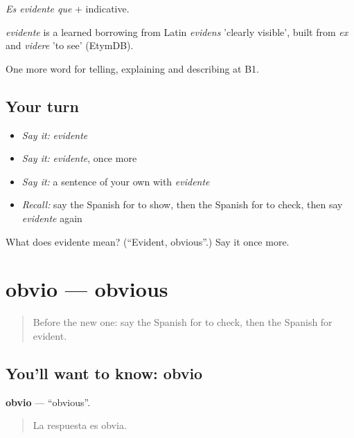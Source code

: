 \emph{Es evidente que} + indicative.

\begin{cousinweb}
\emph{evidente} is a learned borrowing from Latin \emph{evidens} 'clearly visible', built from \emph{ex} and \emph{videre} 'to see' (EtymDB).
\end{cousinweb}

\begin{grammarlens}[title={What you've built}]
One more word for telling, explaining and describing at B1.
\end{grammarlens}

\subsection*{Your turn}
\begin{itemize}
\raggedright
  \item \emph{Say it:} \emph{evidente}
  \item \emph{Say it:} \emph{evidente}, once more
  \item \emph{Say it:} a sentence of your own with \emph{evidente}
  \item \emph{Recall:} say the Spanish for to show, then the Spanish for to check, then say \emph{evidente} again
\end{itemize}

\begin{tcolorbox}[breakable,colback=teal!4,colframe=teal!35!black,title={Before you move on}]
What does evidente mean? (\textquotedblleft{}Evident, obvious\textquotedblright{}.) Say it once more.
\end{tcolorbox}
\section[obvio]{obvio — obvious}

\label{lesson:ES-C587-obvio}



\begin{quote}
Before the new one: say the Spanish for to check, then the Spanish for evident.
\end{quote}

\subsection*{You'll want to know: obvio}
\textbf{obvio} — \textquotedblleft{}obvious\textquotedblright{}.

\begin{quote}
La respuesta es obvia.
\end{quote}

